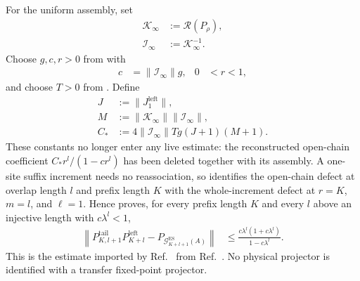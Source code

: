 \documentclass{article}
\begin{document}
For the uniform assembly, set
\begin{align}
    \mathcal K_\infty
     & :=\mathscr R(P_\rho),
    \label{eq:cpgsv21_martingale_overlap_uniform_limiting_gram} \\
    \mathcal I_\infty
     & :=\mathcal K_\infty^{-1}.
    \label{eq:cpgsv21_martingale_overlap_uniform_limiting_inverse}
\end{align}
Choose $g,c,r>0$ from
with
\begin{align}
    c
      & =\lVert\mathcal I_\infty\rVert g,
      &
    0 & <r<1,
    \label{eq:cpgsv21_martingale_overlap_uniform_geometric_constants}
\end{align}
and choose $T>0$ from
. Define
\begin{align}
    J
     & :=\lVert J_1^{\mathrm{left}}\rVert,
    \label{eq:cpgsv21_martingale_overlap_uniform_left_constant}    \\
    M
     & :=
    \lVert\mathcal K_\infty\rVert
    \lVert\mathcal I_\infty\rVert,
    \label{eq:cpgsv21_martingale_overlap_uniform_condition_number} \\
    C_*
     & :=
    4\lVert\mathcal I_\infty\rVert Tg(J+1)(M+1).
    \label{eq:cpgsv21_martingale_overlap_uniform_defect_constant}
\end{align}
These constants no longer enter any live estimate: the reconstructed open-chain
coefficient $C_*r^l/(1-cr^l)$ has been deleted together with its assembly. A
one-site suffix increment needs no reassociation, so
 identifies
the open-chain defect at overlap length $l$ and prefix length $K$ with the
whole-increment defect at $r=K$, $m=l$, and $\ell=1$. Hence
proves, for every prefix length $K$ and every $l$ above an injective length
with $c\lambda^l<1$,
\begin{align}
    \left\lVert
    P^{\mathrm{tail}}_{K,l+1}
    P^{\mathrm{left}}_{K+l}
    -P_{\mathcal G_{K+l+1}^{\mathrm{ES}}(A)}
    \right\rVert
     & \leq\frac{c\lambda^l(1+c\lambda^l)}{1-c\lambda^l}.
    \label{eq:cpgsv21_martingale_overlap_open_chain_uniform_defect}
\end{align}
This is the estimate imported by Ref.~\cite{Nachtergaele1996Spectral} from
Ref.~\cite{Fannes1992Finitely}. No physical projector is identified with a
transfer fixed-point projector.
\end{document}
